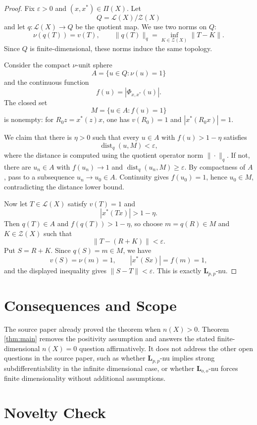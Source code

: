 \documentclass[11pt]{amsart}
\theoremstyle{definition}
\theoremstyle{remark}
\newcommand{\Lcal}{\mathcal L}
\newcommand{\Zcal}{\mathcal Z}
\newcommand{\PiX}{\Pi(X)}
\begin{document}
\begin{proof}
Fix \(\varepsilon>0\) and \((x,x^*)\in\PiX\). Let
\[
  Q=\Lcal(X)/\Zcal(X)
\]
and let \(q:\Lcal(X)\to Q\) be the quotient map. We use two norms on \(Q\):
\[
  \nu(q(T))=v(T),
  \qquad
  \|q(T)\|_q=\inf_{K\in\Zcal(X)}\|T-K\|.
\]
Since \(Q\) is finite-dimensional, these norms induce the same topology.

Consider the compact \(\nu\)-unit sphere
\[
  A=\{u\in Q:\nu(u)=1\}
\]
and the continuous function
\[
  f(u)=|\Phi_{x,x^*}(u)|.
\]
The closed set
\[
  M=\{u\in A:f(u)=1\}
\]
is nonempty: for \(R_0 z=x^*(z)x\), one has \(v(R_0)=1\) and
\(|x^*(R_0x)|=1\).

We claim that there is \(\eta>0\) such that every \(u\in A\) with
\(f(u)>1-\eta\) satisfies
\[
  \operatorname{dist}_q(u,M)<\varepsilon,
\]
where the distance is computed using the quotient operator norm
\(\|\cdot\|_q\). If not, there are \(u_n\in A\) with \(f(u_n)\to1\) and
\(\operatorname{dist}_q(u_n,M)\geq\varepsilon\). By compactness of \(A\), pass
to a subsequence \(u_n\to u_0\in A\). Continuity gives \(f(u_0)=1\), hence
\(u_0\in M\), contradicting the distance lower bound.

Now let \(T\in\Lcal(X)\) satisfy \(v(T)=1\) and
\[
  |x^*(Tx)|>1-\eta.
\]
Then \(q(T)\in A\) and \(f(q(T))>1-\eta\), so choose \(m=q(R)\in M\) and
\(K\in\Zcal(X)\) such that
\[
  \|T-(R+K)\|<\varepsilon.
\]
Put \(S=R+K\). Since \(q(S)=m\in M\), we have
\[
  v(S)=\nu(m)=1,
  \qquad
  |x^*(Sx)|=f(m)=1,
\]
and the displayed inequality gives \(\|S-T\|<\varepsilon\). This is exactly
\(\mathbf L_{p,p}\)-nu.
\end{proof}

\section*{Consequences and Scope}

The source paper already proved the theorem when \(n(X)>0\). Theorem
\ref{thm:main} removes the positivity assumption and answers the stated
finite-dimensional \(n(X)=0\) question affirmatively. It does not address the
other open questions in the source paper, such as whether
\(\mathbf L_{p,p}\)-nu implies strong subdifferentiability in the infinite
dimensional case, or whether \(\mathbf L_{o,o}\)-nu forces finite
dimensionality without additional assumptions.

\section*{Novelty Check}
\end{document}
